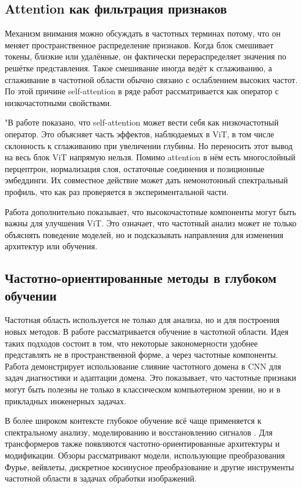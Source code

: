 \subsection{Attention как фильтрация признаков}

Механизм внимания можно обсуждать в частотных терминах потому, что он меняет пространственное распределение признаков. Когда блок смешивает токены, близкие или удалённые, он фактически перераспределяет значения по решётке представления. Такое смешивание иногда ведёт к сглаживанию, а сглаживание в частотной области обычно связано с ослаблением высоких частот. По этой причине self-attention в ряде работ рассматривается как оператор с низкочастотными свойствами.

"В работе \cite{park2022how} показано, что self-attention может вести себя как низкочастотный оператор. Это объясняет часть эффектов, наблюдаемых в ViT, в том числе склонность к сглаживанию при увеличении глубины. Но переносить этот вывод на весь блок ViT напрямую нельзя. Помимо attention в нём есть многослойный перцептрон, нормализация слоя, остаточные соединения и позиционные эмбеддинги. Их совместное действие может дать немонотонный спектральный профиль, что как раз проверяется в экспериментальной части.

Работа \cite{bai2022improving} дополнительно показывает, что высокочастотные компоненты могут быть важны для улучшения ViT. Это означает, что частотный анализ может не только объяснять поведение моделей, но и подсказывать направления для изменения архитектур или обучения.

\subsection{Частотно-ориентированные методы в глубоком обучении}

Частотная область используется не только для анализа, но и для построения новых методов. В работе \cite{xu2020learning} рассматривается обучение в частотной области. Идея таких подходов состоит в том, что некоторые закономерности удобнее представлять не в пространственной форме, а через частотные компоненты. Работа \cite{li2021frequency} демонстрирует использование слияние частотного домена в CNN для задач диагностики и адаптации домена. Это показывает, что частотные признаки могут быть полезны не только в классическом компьютерном зрении, но и в прикладных инженерных задачах.

В более широком контексте глубокое обучение всё чаще применяется к спектральному анализу, моделированию и восстановлению сигналов \cite{liu2024deep}. Для трансформеров также появляются частотно-ориентированные архитектуры и модификации. Обзоры \cite{aslan2026frequency,li2025review} рассматривают модели, использующие преобразования Фурье, вейвлеты, дискретное косинусное преобразование и другие инструменты частотной области в задачах обработки изображений.

